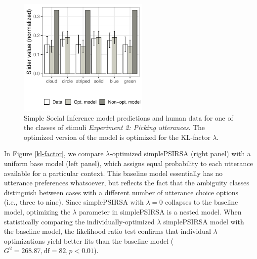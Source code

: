 \documentclass[10pt,a4paper]{article}
\newcommand{\gcs}[1]{\textcolor{blue}{[gcs: #1]}}
\begin{document}
\begin{figure}[ht!]
	\centering
	\includegraphics[width=2.5in]{images/december_barplot_x3.pdf}
	\caption{Simple Social Inference model predictions and human data for one of the classes of stimuli \emph{Experiment 2: Picking utterances}. The optimized version of the model is optimized for the KL-factor $\lambda$.}\label{barplot_x3}
\end{figure}


In Figure \ref{kl-factor}, we compare $\lambda$-optimized simplePSIRSA (right panel) with a uniform base model (left panel), which assigns equal probability to each utterance available for a particular context.
This baseline model essentially has no utterance  preferences whatsoever, but reflects the fact that the ambiguity classes distinguish between cases with a different number of utterance choice options (i.e., three to nine).
 Since simplePSIRSA with $\lambda=0$ collapses to the baseline model, optimizing the $\lambda$ parameter in simplePSIRSA is a nested model. 
 When statistically comparing the individually-optimized $\lambda$ simplePSIRSA model with the baseline model, the likelihood ratio test confirms that individual $\lambda$ optimizations yield better fits than the baseline model ($G^2 = 268.87, \textrm{df} = 82, p <0.01$).
\end{document}
